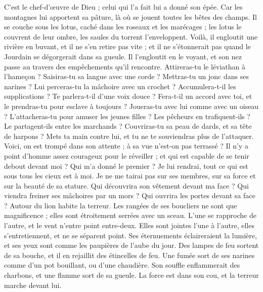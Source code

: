 \begin{multicols}{2}
C'est le chef-d'œuvre de Dieu ; celui qui l'a fait lui a donné son épée.
Car les montagnes lui apportent sa pâture, là où se jouent toutes les bêtes des champs.
Il se couche sous les lotus, caché dans les roseaux et les marécages ;
les lotus le couvrent de leur ombre, les saules du torrent l'enveloppent.
Voilà, il engloutit une rivière en buvant, et il ne s'en retire pas vite ; et il ne s'étonnerait pas quand le Jourdain se dégorgerait dans sa gueule. 
Il l'engloutit en le voyant, et son nez passe au travers des empêchements qu'il rencontre. 
Attireras-tu le léviathan à l'hameçon ? Saisiras-tu sa langue avec une corde ?
Mettras-tu un jonc dans ses narines ? Lui perceras-tu la mâchoire avec un crochet ?
Accumulera-t-il les supplications ? Te parlera-t-il d'une voix douce ?
Fera-t-il un accord avec toi, et le prendras-tu pour esclave à toujours ? 
Joueras-tu avec lui comme avec un oiseau ? L'attacheras-tu pour amuser les jeunes filles ?
Les pêcheurs en trafiquent-ils ? Le partagent-ils entre les marchands ?
Couvriras-tu sa peau de dards, et sa tête de harpons ?
Mets ta main contre lui, et tu ne te souviendras plus de l'attaquer.
Voici, on est trompé dans son attente ; à sa vue n'est-on pas terrassé ?
\VerseOne{}Il n'y a point d'homme assez courageux pour le réveiller ; et qui est capable de se tenir debout devant moi ?
Qui m'a donné le premier ? Je lui rendrai, tout ce qui est sous tous les cieux est à moi.
Je ne me tairai pas sur ses membres, sur sa force et sur la beauté de sa stature.
Qui découvrira son vêtement devant ma face ? Qui viendra freiner ses mâchoires par un mors ?
Qui ouvrira les portes devant sa face ? Autour du lion habite la terreur.
Les rangées de ses boucliers ne sont que magnificence ; elles sont étroitement serrées avec un sceau.
L'une se rapproche de l'autre, et le vent n'entre point entre-deux. 
Elles sont jointes l'une à l'autre, elles s'entretiennent, et ne se séparent point. 
Ses éternuements éclaireraient la lumière, et ses yeux sont comme les paupières de l'aube du jour. 
Des lampes de feu sortent de sa bouche, et il en rejaillit des étincelles de feu. 
Une fumée sort de ses narines comme d'un pot bouillant, ou d'une chaudière. 
Son souffle enflammerait des charbons, et une flamme sort de sa gueule. 
La force est dans son cou, et la terreur marche devant lui. 

\end{multicols}
